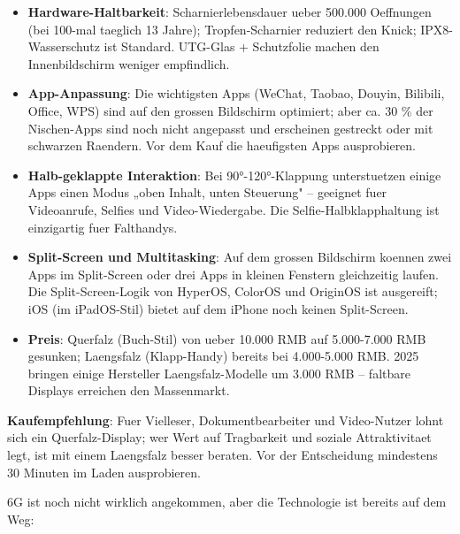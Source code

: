 \begin{itemize}
  \item \textbf{Hardware-Haltbarkeit}: Scharnierlebensdauer ueber 500.000 Oeffnungen (bei 100-mal taeglich 13 Jahre); Tropfen-Scharnier reduziert den Knick; IPX8-Wasserschutz ist Standard. UTG-Glas + Schutzfolie machen den Innenbildschirm weniger empfindlich.
  \item \textbf{App-Anpassung}: Die wichtigsten Apps (WeChat, Taobao, Douyin, Bilibili, Office, WPS) sind auf den grossen Bildschirm optimiert; aber ca. 30 \% der Nischen-Apps sind noch nicht angepasst und erscheinen gestreckt oder mit schwarzen Raendern. Vor dem Kauf die haeufigsten Apps ausprobieren.
  \item \textbf{Halb-geklappte Interaktion}: Bei 90°-120°-Klappung unterstuetzen einige Apps einen Modus „oben Inhalt, unten Steuerung" – geeignet fuer Videoanrufe, Selfies und Video-Wiedergabe. Die Selfie-Halbklapphaltung ist einzigartig fuer Falthandys.
  \item \textbf{Split-Screen und Multitasking}: Auf dem grossen Bildschirm koennen zwei Apps im Split-Screen oder drei Apps in kleinen Fenstern gleichzeitig laufen. Die Split-Screen-Logik von HyperOS, ColorOS und OriginOS ist ausgereift; iOS (im iPadOS-Stil) bietet auf dem iPhone noch keinen Split-Screen.
  \item \textbf{Preis}: Querfalz (Buch-Stil) von ueber 10.000 RMB auf 5.000-7.000 RMB gesunken; Laengsfalz (Klapp-Handy) bereits bei 4.000-5.000 RMB. 2025 bringen einige Hersteller Laengsfalz-Modelle um 3.000 RMB – faltbare Displays erreichen den Massenmarkt.
\end{itemize}

\textbf{Kaufempfehlung}: Fuer Vielleser, Dokumentbearbeiter und Video-Nutzer lohnt sich ein Querfalz-Display; wer Wert auf Tragbarkeit und soziale Attraktivitaet legt, ist mit einem Laengsfalz besser beraten. Vor der Entscheidung mindestens 30 Minuten im Laden ausprobieren.


6G ist noch nicht wirklich angekommen, aber die Technologie ist bereits auf dem Weg:

